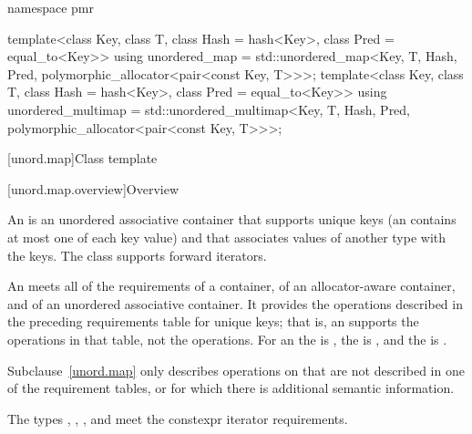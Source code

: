 \begin{codeblock}
{  namespace pmr {
    template<class Key,
             class T,
             class Hash = hash<Key>,
             class Pred = equal_to<Key>>
      using unordered_map =
        std::unordered_map<Key, T, Hash, Pred,
                           polymorphic_allocator<pair<const Key, T>>>;
    template<class Key,
             class T,
             class Hash = hash<Key>,
             class Pred = equal_to<Key>>
      using unordered_multimap =
        std::unordered_multimap<Key, T, Hash, Pred,
                                polymorphic_allocator<pair<const Key, T>>>;

  }
}
\end{codeblock}

[unord.map]{Class template }%

[unord.map.overview]{Overview}

\pnum
{}%
%
An  is an unordered associative container that
supports unique keys (an  contains at most one of each
key value) and that associates values of another type
 with the keys.
The  class
supports forward iterators.

\pnum
An  meets all of the requirements
of a container,
of an allocator-aware container, and
of an unordered associative container.
It provides the operations described in the preceding requirements table for unique keys;
that is, an  supports the  operations in that table,
not the  operations.
For an  the  is ,
the  is ,
and the  is .

\pnum
Subclause~\ref{unord.map} only describes operations on  that
are not described in one of the requirement tables, or for which there
is additional semantic information.

\pnum
The types , ,
, and  meet
the constexpr iterator requirements.

